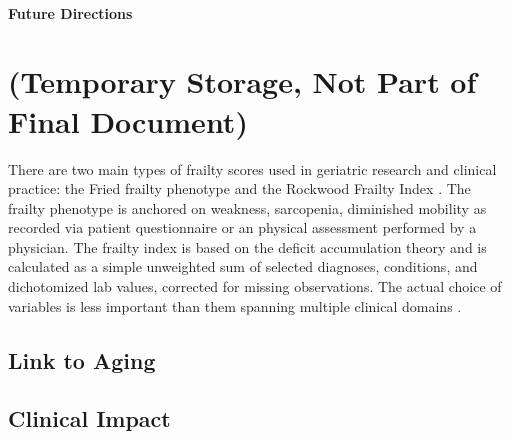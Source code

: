 \paragraph{Future Directions}\label{future-directions} 
    
\section{(Temporary Storage, Not Part of Final Document)}\label{ammo}
There are two main types of frailty scores used in geriatric research and clinical practice: the Fried frailty phenotype \cite{Fried_2001} and the Rockwood Frailty Index \cite{Mitnitski_2001}. The frailty phenotype is anchored on weakness, sarcopenia, diminished mobility as recorded via patient questionnaire or an physical assessment performed by a physician. The frailty index is based on the deficit accumulation theory and is calculated as a simple unweighted sum of selected diagnoses, conditions, and dichotomized lab values, corrected for missing observations. The actual choice of variables is less important than them spanning multiple clinical domains \cite{Searle_2008}. 

\subsection{Link to Aging}\label{link-to-aging}

\subsection{Clinical Impact}\label{clinical-impact}



